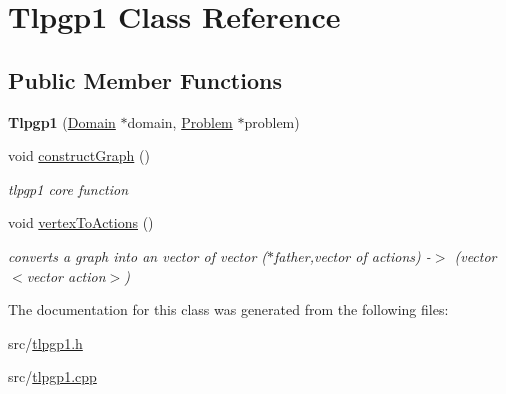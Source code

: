 \hypertarget{classTlpgp1}{\section{Tlpgp1 Class Reference}
\label{classTlpgp1}
}
\subsection*{Public Member Functions}
\begin{DoxyCompactItemize}
\item 
\hypertarget{classTlpgp1_a3b25a7a10b2c57010a1b840a45fc8f3e}{{\bfseries Tlpgp1} (\hyperlink{classDomain}{Domain} $\ast$domain, \hyperlink{classProblem}{Problem} $\ast$problem)}\label{classTlpgp1_a3b25a7a10b2c57010a1b840a45fc8f3e}

\item 
\hypertarget{classTlpgp1_aa11e139d77987da500f752fd865a72e6}{void \hyperlink{classTlpgp1_aa11e139d77987da500f752fd865a72e6}{construct\+Graph} ()}\label{classTlpgp1_aa11e139d77987da500f752fd865a72e6}

\begin{DoxyCompactList}\small\item\em tlpgp1 core function \end{DoxyCompactList}\item 
\hypertarget{classTlpgp1_ac1f49c011d952f18cc1f5bcc1d87fcea}{void \hyperlink{classTlpgp1_ac1f49c011d952f18cc1f5bcc1d87fcea}{vertex\+To\+Actions} ()}\label{classTlpgp1_ac1f49c011d952f18cc1f5bcc1d87fcea}

\begin{DoxyCompactList}\small\item\em converts a graph into an vector of vector ($\ast$father,vector of actions) -\/$>$ (vector$<$vector action$>$) \end{DoxyCompactList}\end{DoxyCompactItemize}


The documentation for this class was generated from the following files\+:\begin{DoxyCompactItemize}
\item 
src/\hyperlink{tlpgp1_8h}{tlpgp1.\+h}\item 
src/\hyperlink{tlpgp1_8cpp}{tlpgp1.\+cpp}\end{DoxyCompactItemize}
